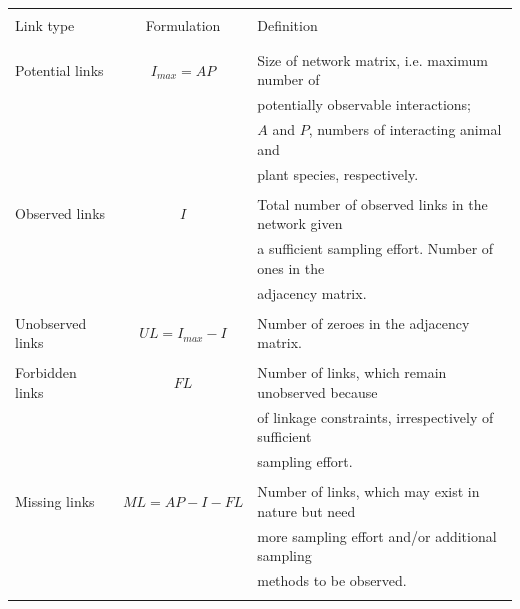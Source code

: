 \documentclass[12pt]{article}
\begin{document}
\begin{table}[h!]
  \caption{}
  \begin{center}
		\begin{tabular}{lcl}
      \hline
\\Link type   &  Formulation   &   Definition\\\\
      \hline
\\Potential links&$I_{max}= AP$&Size of network matrix, i.e. maximum number of \\ && potentially observable interactions;  \\ && $A$ and $P$, numbers of interacting animal and \\ &&  plant species, respectively.\\\\
Observed links&$I$&Total number of observed links in the network given \\ &&  a sufficient sampling effort. Number of ones in the  \\ && adjacency matrix.\\\\
Unobserved links&$UL= I_{max} - I$&Number of zeroes in the adjacency matrix.\\\\
Forbidden links&$FL$&Number of links, which remain unobserved because  \\ && of linkage constraints, irrespectively of sufficient  \\ && sampling effort.\\\\
Missing links&$ML= AP - I - FL$&Number of links, which may exist in nature but need  \\ && more sampling effort and\slash or additional sampling  \\ && methods to be observed.\\\\
      \hline
		\end{tabular}
 	\end{center}
\end{table}
%
\newpage
\end{document}
